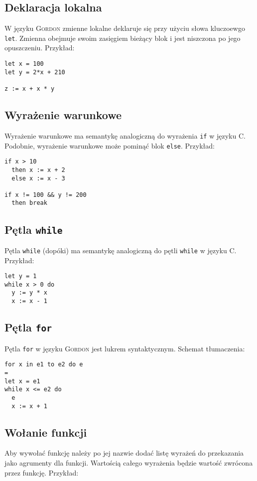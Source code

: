 \documentclass{documentation}
\begin{document}
\subsection{Deklaracja lokalna}
W języku \textsc{Gordon} zmienne lokalne deklaruje się przy użyciu słowa kluczoewgo
\texttt{let}. Zmienna obejmuje swoim zasięgiem bieżący blok i jest niszczona po
jego opuszczeniu. Przykład:

\begin{verbatim}
let x = 100
let y = 2*x + 210

z := x + x * y
\end{verbatim}

\subsection{Wyrażenie warunkowe}
Wyrażenie warunkowe ma semantykę analogiczną do wyrażenia \texttt{if}
w języku \textsc{C}. Podobnie, wyrażenie warunkowe może pominąć blok \texttt{else}.
Przykład:

\begin{verbatim}
if x > 10
  then x := x + 2
  else x := x - 3

if x != 100 && y != 200
  then break
\end{verbatim}

\subsection{Pętla \texttt{while}}
Pętla \texttt{while} (dopóki) ma semantykę analogiczną do pętli \texttt{while} w języku
\textsc{C}. Przykład:

\begin{verbatim}
let y = 1
while x > 0 do
  y := y * x
  x := x - 1
\end{verbatim}

\subsection{Pętla \texttt{for}}
Pętla \texttt{for} w języku \textsc{Gordon} jest lukrem syntaktycznym. Schemat tłumaczenia:

\begin{verbatim}
for x in e1 to e2 do e
=
let x = e1
while x <= e2 do
  e
  x := x + 1
\end{verbatim}

\subsection{Wołanie funkcji}
Aby wywołać funkcję należy po jej nazwie dodać listę wyrażeń do przekazania jako agrumenty dla funkcji.
Wartością całego wyrażenia będzie wartość zwrócona przez funkcję.
Przykład:
\end{document}
